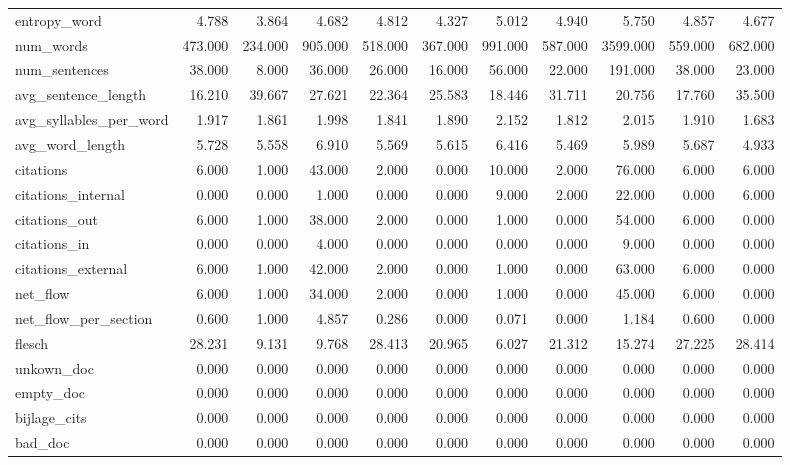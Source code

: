 \begin{tabular}{lrrrrrrrrrr}
\cline{1-11}
entropy\_word & 4.788 & 3.864 & 4.682 & 4.812 & 4.327 & 5.012 & 4.940 & 5.750 & 4.857 & 4.677 \\
\cline{1-11}
num\_words & 473.000 & 234.000 & 905.000 & 518.000 & 367.000 & 991.000 & 587.000 & 3599.000 & 559.000 & 682.000 \\
\cline{1-11}
num\_sentences & 38.000 & 8.000 & 36.000 & 26.000 & 16.000 & 56.000 & 22.000 & 191.000 & 38.000 & 23.000 \\
\cline{1-11}
avg\_sentence\_length & 16.210 & 39.667 & 27.621 & 22.364 & 25.583 & 18.446 & 31.711 & 20.756 & 17.760 & 35.500 \\
\cline{1-11}
avg\_syllables\_per\_word & 1.917 & 1.861 & 1.998 & 1.841 & 1.890 & 2.152 & 1.812 & 2.015 & 1.910 & 1.683 \\
\cline{1-11}
avg\_word\_length & 5.728 & 5.558 & 6.910 & 5.569 & 5.615 & 6.416 & 5.469 & 5.989 & 5.687 & 4.933 \\
\cline{1-11}
citations & 6.000 & 1.000 & 43.000 & 2.000 & 0.000 & 10.000 & 2.000 & 76.000 & 6.000 & 6.000 \\
\cline{1-11}
citations\_internal & 0.000 & 0.000 & 1.000 & 0.000 & 0.000 & 9.000 & 2.000 & 22.000 & 0.000 & 6.000 \\
\cline{1-11}
citations\_out & 6.000 & 1.000 & 38.000 & 2.000 & 0.000 & 1.000 & 0.000 & 54.000 & 6.000 & 0.000 \\
\cline{1-11}
citations\_in & 0.000 & 0.000 & 4.000 & 0.000 & 0.000 & 0.000 & 0.000 & 9.000 & 0.000 & 0.000 \\
\cline{1-11}
citations\_external & 6.000 & 1.000 & 42.000 & 2.000 & 0.000 & 1.000 & 0.000 & 63.000 & 6.000 & 0.000 \\
\cline{1-11}
net\_flow & 6.000 & 1.000 & 34.000 & 2.000 & 0.000 & 1.000 & 0.000 & 45.000 & 6.000 & 0.000 \\
\cline{1-11}
net\_flow\_per\_section & 0.600 & 1.000 & 4.857 & 0.286 & 0.000 & 0.071 & 0.000 & 1.184 & 0.600 & 0.000 \\
\cline{1-11}
flesch & 28.231 & 9.131 & 9.768 & 28.413 & 20.965 & 6.027 & 21.312 & 15.274 & 27.225 & 28.414 \\
\cline{1-11}
unkown\_doc & 0.000 & 0.000 & 0.000 & 0.000 & 0.000 & 0.000 & 0.000 & 0.000 & 0.000 & 0.000 \\
\cline{1-11}
empty\_doc & 0.000 & 0.000 & 0.000 & 0.000 & 0.000 & 0.000 & 0.000 & 0.000 & 0.000 & 0.000 \\
\cline{1-11}
bijlage\_cits & 0.000 & 0.000 & 0.000 & 0.000 & 0.000 & 0.000 & 0.000 & 0.000 & 0.000 & 0.000 \\
\cline{1-11}
bad\_doc & 0.000 & 0.000 & 0.000 & 0.000 & 0.000 & 0.000 & 0.000 & 0.000 & 0.000 & 0.000 \\
\cline{1-11}
\bottomrule
\end{tabular}
